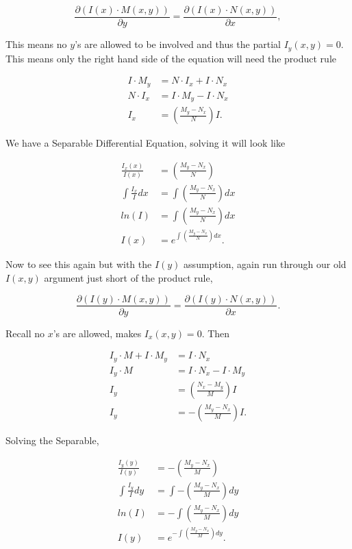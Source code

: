 \documentclass[12pt]{article}
\begin{document}
\begin{equation*}
    \frac{\partial (I(x)\cdot M(x,y))}{\partial y} = \frac{\partial(I(x)\cdot N(x,y))}{\partial x},
\end{equation*}

This means no $y$'s are allowed to be involved and thus the partial $I_y(x,y)=0$. This means only the right hand side of the equation will need the product rule

\begin{align*}
    I \cdot M_y  &= N \cdot I_x + I\cdot N_x \\
    N \cdot I_x &= I\cdot M_y - I\cdot N_x \\
    I_x &= \left(\frac{M_y-N_x}{N}\right) I.
\end{align*}

We have a Separable Differential Equation, solving it will look like

\begin{align*}
    \frac{I_x(x)}{I(x)}&=\left(\frac{M_y-N_x}{N}\right) \\
    \int \frac{I_x}{I} dx &=\int \left(\frac{M_y-N_x}{N}\right) dx \\
    ln(I)&=\int\left(\frac{M_y-N_x}{N}\right) dx \\
    I(x) &= e^{\int\left(\frac{M_y-N_x}{N}\right) dx}.
\end{align*}

Now to see this again but with the $I(y)$ assumption, again run through our old $I(x,y)$ argument just short of the product rule,

\begin{equation*}
    \frac{\partial (I(y)\cdot M(x,y))}{\partial y} = \frac{\partial(I(y)\cdot N(x,y))}{\partial x}.
\end{equation*}

Recall no $x$'s are allowed, makes $I_x(x,y)=0$. Then

\begin{align*}
    I_y \cdot M + I \cdot M_y  &= I \cdot N_x \\
    I_y \cdot M &= I \cdot N_x - I \cdot M_y \\
    I_y &= \left(\frac{N_x-M_y}{M}\right) I \\
    I_y &= -\left(\frac{M_y-N_x}{M}\right) I.
\end{align*}

Solving the Separable,

\begin{align*}
    \frac{I_y(y)}{I(y)} &= -\left(\frac{M_y-N_x}{M}\right) \\
    \int \frac{I_y}{I} dy &= \int -\left(\frac{M_y-N_x}{M}\right) dy \\
    ln(I)&=-\int\left(\frac{M_y-N_x}{M}\right) dy \\
    I(y) &= e^{-\int\left(\frac{M_y-N_x}{M}\right) dy}.
\end{align*}
\end{document}
